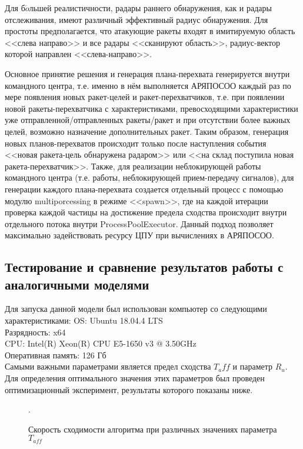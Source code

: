 Для б$\acute{o}$льшей реалистичности, радары раннего обнаружения, как и радары отслеживания, имеют различный эффективный радиус обнаружения. Для простоты предполагается, что атакующие ракеты входят в имитируемую область <<слева направо>> и все радары <<сканируют область>>, радиус-вектор которой направлен <<слева-направо>>.

Основное принятие решения и генерация плана-перехвата генерируется внутри командного центра, т.е. именно в нём выполняется АРЯПОСОО каждый раз по мере появления новых ракет-целей и ракет-перехватчиков, т.е. при появлении новой ракеты-перехватчика с характеристиками, превосходящими характеристики уже отправленной/отправленных ракеты/ракет и при отсутствии более важных целей, возможно назначение дополнительных ракет. Таким образом, генерация новых планов-перехватов происходит только после наступления события <<новая ракета-цель обнаружена радаром>> или <<на склад поступила новая ракета-перехватчик>>. Также, для реализации неблокирующей работы командного центра (т.е. работы, неблокирующей прием-передачу сигналов), для генерации каждого плана-перехвата создается отдельный процесс с помощью модулю multiporcessing в режиме <<spawn>>, где на каждой итерации проверка каждой частицы на достижение предела сходства происходит внутри отдельного потока внутри ProcessPoolExecutor. Данный подход позволяет максимально задействовать ресурсу ЦПУ при вычислениях  в АРЯПОСОО. 


\subsection{Тестирование и сравнение результатов работы с аналогичными моделями }

Для запуска данной модели был использован компьютер со следующими характеристиками:
OS: Ubuntu 18.04.4 LTS \\
Разрядность: x64 \\
CPU:  Intel(R) Xeon(R) CPU E5-1650 v3 @ 3.50GHz \\
Оперативная память: 126 Гб \\

Самыми важными параметрами является предел сходства $T_aff$ и параметр $R_u$. Для определения оптимального значения этих параметров был проведен оптимизационный эксперимент, результаты которого показаны ниже.


\begin{figure*}[h!]
	\caption{Скорость сходимости алгоритма при различных значениях параметра $T_{aff}$}.
\end{figure*} 


